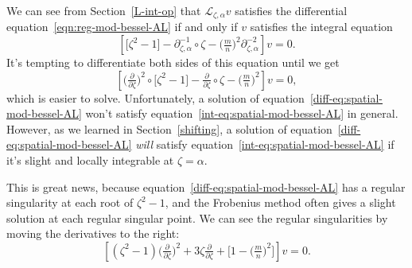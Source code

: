 \documentclass{article}
\theoremstyle{definition}
\newcommand{\fracderiv}[3]{\partial^{#1}_{#2, #3}}
\newcommand{\laplace}{\mathcal{L}}
\begin{document}
We can see from Section~\ref{L-int-op} that $\laplace_{\zeta, \alpha} v$ satisfies the differential equation~\eqref{eqn:reg-mod-bessel-AL} if and only if $v$ satisfies the integral equation
\begin{equation}\label{int-eq:spatial-mod-bessel-AL}
\left[ \big[ \zeta^2 - 1 \big] - \fracderiv{-1}{\zeta}{\alpha} \circ \zeta - \big(\tfrac{m}{n}\big)^2 \fracderiv{-2}{\zeta}{\alpha} \right] v = 0.
\end{equation}
It's tempting to differentiate both sides of this equation until we get
\begin{equation}\label{diff-eq:spatial-mod-bessel-AL}
\left[ \big(\tfrac{\partial}{\partial \zeta}\big)^2 \circ \big[ \zeta^2 - 1 \big] - \tfrac{\partial}{\partial \zeta} \circ \zeta - \big(\tfrac{m}{n}\big)^2 \right] v = 0,
\end{equation}
which is easier to solve. Unfortunately, a solution of equation~\eqref{diff-eq:spatial-mod-bessel-AL} won't satisfy equation~\eqref{int-eq:spatial-mod-bessel-AL} in general. However, as we learned in Section~\ref{shifting}, a solution of equation~\eqref{diff-eq:spatial-mod-bessel-AL} {\em will} satisfy equation~\eqref{int-eq:spatial-mod-bessel-AL} if it's slight and locally integrable at $\zeta = \alpha$.

This is great news, because equation~\eqref{diff-eq:spatial-mod-bessel-AL} has a regular singularity at each root of $\zeta^2 - 1$, and the Frobenius method often gives a slight solution at each regular singular point. We can see the regular singularities by moving the derivatives to the right:
\[ \left[ (\zeta^2 - 1) \big(\tfrac{\partial}{\partial \zeta}\big)^2 + 3\zeta \tfrac{\partial}{\partial \zeta} + \big[ 1 - \big(\tfrac{m}{n}\big)^2 \big] \right] v = 0. \]
\end{document}
